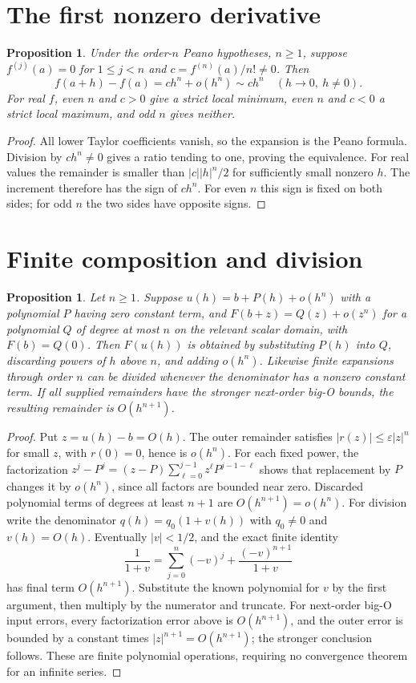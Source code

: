 \documentclass[11pt,oneside,a4paper]{book}
\newtheorem{proposition}[theorem]{Proposition}
\theoremstyle{definition}
\theoremstyle{remark}
\newcommand{\eps}{\varepsilon}
\newcommand{\KEntry}[2]{\Needspace{7\baselineskip}\section{#2}\label{#1}{\small\sffamily\color{black!60}\detokenize{#1}}\par}
\begin{document}
\KEntry{K03.06.leading_term}{The first nonzero derivative}
\begin{proposition}
Under the order-$n$ Peano hypotheses, $n\ge1$, suppose $f^{(j)}(a)=0$ for $1\le j<n$ and $c=f^{(n)}(a)/n!\ne0$. Then
\[ f(a+h)-f(a)=ch^n+o(h^n)\sim ch^n\quad(h\to0,\ h\ne0). \]
For real $f$, even $n$ and $c>0$ give a strict local minimum, even $n$ and $c<0$ a strict local maximum, and odd $n$ gives neither.
\end{proposition}
\begin{proof}
All lower Taylor coefficients vanish, so the expansion is the Peano formula. Division by $ch^n\ne0$ gives a ratio tending to one, proving the equivalence. For real values the remainder is smaller than $|c||h|^n/2$ for sufficiently small nonzero $h$. The increment therefore has the sign of $ch^n$. For even $n$ this sign is fixed on both sides; for odd $n$ the two sides have opposite signs.
\end{proof}

\KEntry{K03.06.composition}{Finite composition and division}
\begin{proposition}
Let $n\ge1$. Suppose $u(h)=b+P(h)+o(h^n)$ with a polynomial $P$ having zero constant term, and $F(b+z)=Q(z)+o(z^n)$ for a polynomial $Q$ of degree at most $n$ on the relevant scalar domain, with $F(b)=Q(0)$. Then $F(u(h))$ is obtained by substituting $P(h)$ into $Q$, discarding powers of $h$ above $n$, and adding $o(h^n)$. Likewise finite expansions through order $n$ can be divided whenever the denominator has a nonzero constant term. If all supplied remainders have the stronger next-order big-O bounds, the resulting remainder is $O(h^{n+1})$.
\end{proposition}
\begin{proof}
Put $z=u(h)-b=O(h)$. The outer remainder satisfies $|r(z)|\le\eps|z|^n$ for small $z$, with $r(0)=0$, hence is $o(h^n)$. For each fixed power, the factorization $z^j-P^j=(z-P)\sum_{\ell=0}^{j-1}z^\ell P^{j-1-\ell}$ shows that replacement by $P$ changes it by $o(h^n)$, since all factors are bounded near zero. Discarded polynomial terms of degrees at least $n+1$ are $O(h^{n+1})=o(h^n)$.
For division write the denominator $q(h)=q_0(1+v(h))$ with $q_0\ne0$ and $v(h)=O(h)$. Eventually $|v|<1/2$, and the exact finite identity
\[ \frac1{1+v}=\sum_{j=0}^n(-v)^j+\frac{(-v)^{n+1}}{1+v} \]
has final term $O(h^{n+1})$. Substitute the known polynomial for $v$ by the first argument, then multiply by the numerator and truncate. For next-order big-O input errors, every factorization error above is $O(h^{n+1})$, and the outer error is bounded by a constant times $|z|^{n+1}=O(h^{n+1})$; the stronger conclusion follows. These are finite polynomial operations, requiring no convergence theorem for an infinite series.
\end{proof}
\end{document}
